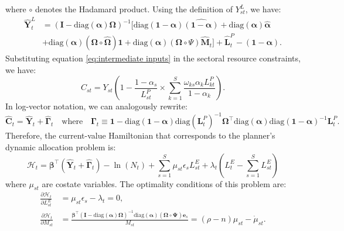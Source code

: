 \documentclass[12pt]{article}
\newcommand{\partialof}[2]{\frac{\partial #1}{\partial #2}}
\begin{document}
where $\circ$ denotes the Hadamard product. Using the definition of $Y_{st}^L$, we have:
\begin{align*}
    \hat{\mathbf{Y}}_t^L &= (\mathbf{I} - \text{diag}(\bm{\alpha}) \bm{\Omega})^{-1} [\text{diag}(\mathbf{1} - \bm{\alpha}) \widehat{(\mathbf{1} - \bm{\alpha})} + \text{diag}(\bm{\alpha}) \hat{\bm{\alpha}} \\
    &+ \text{diag}(\bm{\alpha}) (\bm{\Omega} \circ \hat{\bm{\Omega}}) \mathbf{1} + \text{diag}(\bm{\alpha}) (\bm{\Omega} \circ \Psi) \hat{\mathbf{M}}_t] + \hat{\mathbf{L}}_t^P - \widehat{(\mathbf{1} - \bm{\alpha})}.
\end{align*}
Substituting equation \eqref{eq:intermediate inputs} in the sectoral resource constraints, we have:
\begin{equation*}
    C_{st} = Y_{st} \left(1 - \frac{1 - \alpha_s}{L_{st}^P} \times \sum_{k = 1}^S \frac{\omega_{ks} \alpha_k L_{kt}^P}{1 - \alpha_k}\right).
\end{equation*}
In log-vector notation, we can analogously rewrite:
\begin{equation*}
    \hat{\mathbf{C}}_t = \hat{\mathbf{Y}}_t + \hat{\bm{\Gamma}}_t \quad \text{where} \quad \bm{\Gamma}_t \equiv \mathbf{1} - \text{diag}(\mathbf{1} - \bm{\alpha}) \text{diag}(\mathbf{L}_t^P)^{-1} \bm{\Omega}^{\top} \text{diag}(\bm{\alpha}) \text{diag}(\mathbf{1} - \bm{\alpha})^{-1} \mathbf{L}_t^P.
\end{equation*}
Therefore, the current-value Hamiltonian that corresponds to the planner's dynamic allocation problem is:
\begin{equation*}
    \mathcal{H}_t = \bm{\beta}^{\top} (\hat{\mathbf{Y}}_t + \hat{\bm{\Gamma}}_t) - \ln(N_t) + \sum_{s = 1}^S \mu_{st} \epsilon_s L_{st}^E + \lambda_t \left(L_t^E - \sum_{s = 1}^S L_{st}^E\right)
\end{equation*}
where $\mu_{st}$ are costate variables. The optimality conditions of this problem are:
\begin{align*}
    \partialof{\mathcal{H}_t}{L_{st}^E} &= \mu_{st} \epsilon_s - \lambda_t = 0, \\
    \partialof{\mathcal{H}_t}{M_{st}} &= \frac{\bm{\beta}^{\top} (\mathbf{I} - \text{diag}(\bm{\alpha}) \bm{\Omega})^{-1} \text{diag}(\bm{\alpha}) (\bm{\Omega} \circ \bm{\Psi}) \mathbf{e}_s}{M_{st}} = (\rho - n) \mu_{st} - \dot{\mu}_{st}.
\end{align*}
\end{document}
